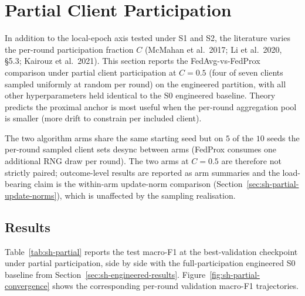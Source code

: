 \documentclass[11pt,a4paper]{report}
\begin{document}
\section{Partial Client Participation}
\label{sec:sh-partial-participation}

In addition to the local-epoch axis tested under S1 and S2, the
literature varies the per-round participation fraction $C$
(McMahan et al.\ 2017; Li et al.\ 2020, §5.3; Kairouz et al.\ 2021).
This section reports the FedAvg-vs-FedProx comparison under
partial client participation at $C = 0.5$ (four of seven clients
sampled uniformly at random per round) on the engineered partition,
with all other hyperparameters held identical to the S0 engineered
baseline. Theory predicts the proximal anchor is most useful when
the per-round aggregation pool is smaller (more drift to constrain
per included client).

The two algorithm arms share the same starting seed but on $5$ of
the $10$ seeds the per-round sampled client sets desync between
arms (FedProx consumes one additional RNG draw per round). The two
arms at $C = 0.5$ are therefore not strictly paired; outcome-level
results are reported as arm summaries and the load-bearing claim
is the within-arm update-norm comparison
(Section~\ref{sec:sh-partial-update-norms}), which is unaffected
by the sampling realisation.

\subsection{Results}
\label{sec:sh-partial-results}

Table~\ref{tab:sh-partial} reports the test macro-F1 at the
best-validation checkpoint under partial participation, side by
side with the full-participation engineered S0 baseline from
Section~\ref{sec:sh-engineered-results}.
Figure~\ref{fig:sh-partial-convergence} shows the corresponding
per-round validation macro-F1 trajectories.
\end{document}
